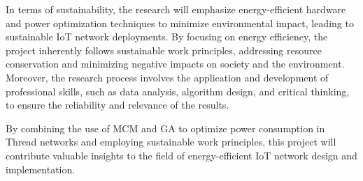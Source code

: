 In terms of sustainability, the research will emphasize energy-efficient hardware and power optimization techniques to minimize environmental impact, leading to sustainable \gls{IoT} network deployments. By focusing on energy efficiency, the project inherently follows sustainable work principles, addressing resource conservation and minimizing negative impacts on society and the environment. Moreover, the research process involves the application and development of professional skills, such as data analysis, algorithm design, and critical thinking, to ensure the reliability and relevance of the results.

By combining the use of \gls{MCM} and \gls{GA} to optimize power consumption in Thread networks and employing sustainable work principles, this project will contribute valuable insights to the field of energy-efficient \gls{IoT} network design and implementation.
